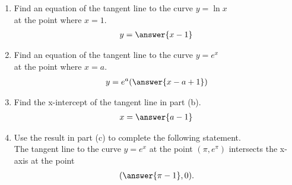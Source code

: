 \documentclass{ximera}
\author{Nela Lakos}
\begin{document}
\begin{exercise}
\begin{enumerate}

\item Find an equation of the tangent line to the curve $y=\ln{x}$ \\at the point where $x=1$. 
\begin{align*}
y &= \answer{x-1}\\
\end{align*}
\item Find an equation of the tangent line to the curve $y=e^{x}$ \\at the point where $x=a$. 
\begin{align*}
y &= e^{a}(\answer{x-a+1})\\
\end{align*}
\item Find the x-intercept of the tangent line in part (b). 
\begin{align*}
x &= \answer{a-1}\\
\end{align*}
\item Use the result in part (c) to complete the following statement.\\
The tangent line to the curve $y=e^x$ at the point $(\pi, e^{\pi})$  intersects the x-axis at the point
\begin{align*}
  ( \answer{\pi-1},0).\\
\end{align*}
\end{enumerate}
\end{exercise}
\end{document}
